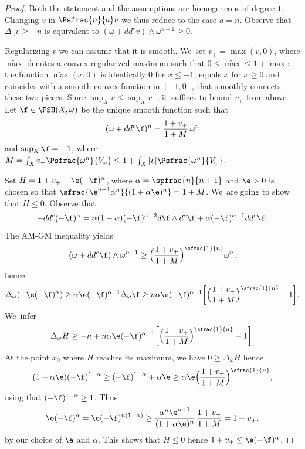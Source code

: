 \begin{proof}
Both the statement and the assumptions are homogeneous of degree $1$.
Changing $v$ in $\Psfrac{n}{a} v$ we thus reduce to the case $a=n$.
Observe that $\Delta_{\omega} v \geq -n$ is equivalent to $(\omega+dd^c v) \wedge \omega^{n-1} \geq 0$.

Regularizing $v$ we can assume that it is smooth. We~set $v_+=\widetilde{\max}(v,0)$, where
$\widetilde{\max}$ denotes a convex regularized maximum such that $0\leq \widetilde{\max} \leq 1+ \max$:
the function $\widetilde{\max}(x,0)$ is identically $0$ for $x \leq -1$, equals $x$ for $x \geq 0$ and
coincides with a smooth convex function in $[-1,0]$, that smoothly connects these two pieces.
Since $\sup_X v \leq \sup_X v_+$, it~suffices to bound $v_+$ from above.
Let $\f \in\PSH(X,\omega)$ be the unique smooth function such that\vspace*{-3pt}
\[
(\omega+dd^c \f)^n=\frac{1+v_+}{1+M}\, \omega^n
\]
and $\sup_X \f=-1$, where
$M=\int_X v_+ \Psfrac{\omega^n}{V_\omega} \leq 1+ \int_X |v| \Psfrac{\omega^n}{V_\omega}$.

Set $H=1+v_+-\e (-\f)^{\alpha}$, where $\alpha=\spfrac{n}{n+1}$ and
$\e>0$ is chosen so that $\sfrac{\e^{n+1}\alpha^n}{(1+\alpha \e)^n}=1+M$. We~are going to show that $H \leq 0$.
Observe that
\[
-dd^c (-\f)^{\alpha}=\alpha(1-\alpha) (-\f)^{\alpha-2} d\f \wedge d^c \f +\alpha(-\f)^{\alpha-1} dd^c \f.
\]
The AM-GM inequality yields\vspace*{-3pt}
\[
(\omega+dd^c \f) \wedge \omega^{n-1} \geq \Bigl(\frac{1+v_+}{1+M} \Bigr)^{\sfrac{1}{n}} \omega^n,
\]
hence\vspace*{-3pt}
\[
\Delta_{\omega}(-\e (-\f)^{\alpha}) \geq \alpha \e(-\f)^{\alpha-1} \Delta_{\omega} \f
\geq n \alpha \e(-\f)^{\alpha-1} \biggl[ \Bigl(\frac{1+v_+}{1+M} \Bigr)^{\sfrac{1}{n}} -1 \biggr].
\]
We~infer
\[
\Delta_{\omega}H \geq -n+n \alpha \e(-\f)^{\alpha-1} \biggl[ \Bigl(\frac{1+v_+}{1+M} \Bigr)^{\sfrac{1}{n}} -1 \biggr].
\]
At the point $x_0$ where $H$ reaches its maximum, we have $0 \geq \Delta_{\omega}H $ hence
\[
(1+\alpha \e)(-\f)^{1-\alpha} \geq (-\f)^{1-\alpha}+\alpha \e \geq
\alpha \e \Bigl(\frac{1+v_+}{1+M} \Bigr)^{\sfrac{1}{n}},
\]
using that $(-\f)^{1-\alpha} \geq 1$. Thus
\[
\e (-\f)^{\alpha}=\e (-\f)^{n(1-\alpha)} \geq \frac{\alpha^n \e^{n+1}}{(1+\alpha \e)^n}\, \frac{1+v_+}{1+M}=1+v_+,
\]
by our choice of $\e$ and $\alpha$. This shows that $H \leq 0$
hence $1+v_+ \leq \e (-\f)^{\alpha}$.


\end{proof}
